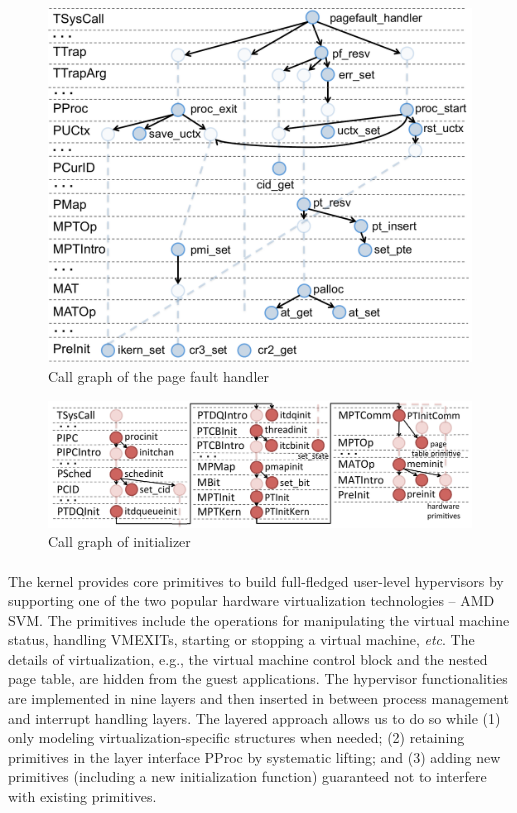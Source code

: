 {\begin{figure}
\center
\includegraphics[scale=0.3]{figs/pagefault2}
\caption{Call graph of the page fault handler}
\label{fig:pagefault-call-graph}
\end{figure}

\begin{figure}
\center
\includegraphics[scale=0.3]{figs/initialization}
\caption{Call graph of \mCTOSbase{} initializer}
\label{fig:mcertikos-init-call-graph}
\end{figure}

\paragraph{\mCTOShyper{}}
The \mCTOShyper{} kernel provides core primitives to build
full-fledged user-level hypervisors by supporting one of the two
popular hardware virtualization technologies -- AMD SVM.  The primitives
include the operations for manipulating the virtual machine status,
handling VMEXITs, starting or stopping a virtual machine, {\it etc}.
The details of virtualization, e.g., the virtual machine control block
and the nested page table, are hidden from the guest applications.
The hypervisor functionalities are implemented in nine layers and then
inserted in between process management and interrupt handling layers.
The layered approach allows us to do so while (1) only modeling
virtualization-specific structures when needed; (2) retaining
primitives in the layer interface \textsf{PProc} by systematic lifting; and
(3) adding new primitives (including a new initialization function)
guaranteed not to interfere with existing primitives.

}
